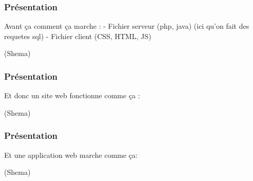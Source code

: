 \documentclass[10pt]{beamer}
\begin{document}
	\begin{frame}
		\frametitle{Présentation}

		Avant ça comment ça marche :
		\newline \newline
		- Fichier serveur (php, java) (ici qu'on fait des requetes sql)\newline
		- Fichier client (CSS, HTML, JS)

		(Shema)

	\end{frame}

	\begin{frame}
		\frametitle{Présentation}

		Et donc un site web fonctionne comme ça :
		\newline \newline

		(Shema)

	\end{frame}

	\begin{frame}
		\frametitle{Présentation}

		Et une application web marche comme ça:
		\newline \newline

		(Shema)

	\end{frame}
\end{document}
